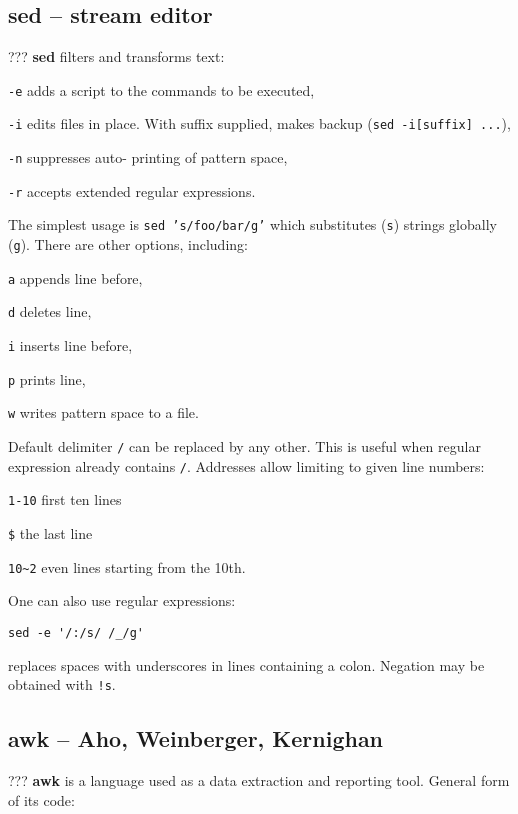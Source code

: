 \subsection{sed -- stream editor}
\begin{compactenum}
	\item [???] \textbf{sed} filters and transforms text:
	\item [\texttt{-e}] adds a script to the commands to be executed,
	\item [\texttt{-i}] edits files in place. With suffix supplied, makes backup (\texttt{sed -i[suffix] ...}), 
	\item [\texttt{-n}] suppresses auto- printing of pattern space,
  \item [\texttt{-r}] accepts extended regular expressions.
\end{compactenum}

The simplest usage is \texttt{sed 's/foo/bar/g'}
which substitutes (\texttt{s}) strings globally (\texttt{g}).
There are other options, including:
\begin{compactenum}
\item [\texttt{a}] appends line before,
\item [\texttt{d}] deletes line,
\item [\texttt{i}] inserts line before,
\item [\texttt{p}] prints line,
\item [\texttt{w}] writes pattern space to a file.
\end{compactenum}

Default delimiter \texttt{/} can be replaced by any other.
This is useful when regular expression already contains \texttt{/}.
Addresses allow limiting to given line numbers:
\begin{compactenum}
\item \texttt{1-10} first ten lines
\item \texttt{\$} the last line
\item \texttt{10\textasciitilde 2} even lines starting from the 10th.
\end{compactenum}

One can also use regular expressions:
\begin{verbatim}
sed -e '/:/s/ /_/g'
\end{verbatim}
replaces spaces with underscores in lines containing a colon.
Negation may be obtained with \texttt{!s}.


\subsection{awk -- Aho, Weinberger, Kernighan}
\begin{compactenum}
\item [???] \textbf{awk} is a language used as a data extraction and reporting tool.
General form of its code:
\end{compactenum}

